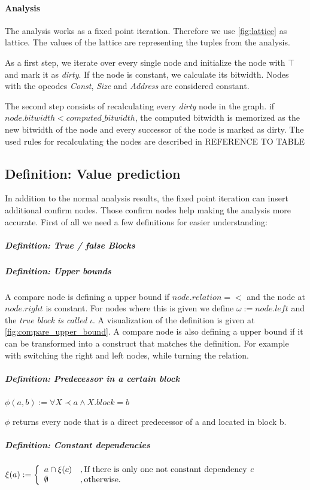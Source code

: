 

\paragraph{Analysis} The analysis works as a fixed point iteration. Therefore we use  \ref{fig:lattice} as lattice. The values of the lattice are representing the tuples from the analysis.

As a first step, we iterate over every single node and initialize the node with $\top$ and mark it as \textit{dirty}. If the node is constant, we calculate its bitwidth. Nodes with the opcodes \textit{Const}, \textit{Size} and \textit{Address} are considered constant.

The second step consists of recalculating every \textit{dirty} node in the graph. if $node.bitwidth < computed\_bitwidth$, the computed bitwidth is memorized as the new bitwidth of the node and every successor of the node is marked as dirty. The used rules for recalculating the nodes are described in REFERENCE TO TABLE %

\subsection{Definition: Value prediction}
In addition to the normal analysis results, the fixed point iteration can insert additional 
confirm nodes. Those confirm nodes help making the analysis more accurate.
First of all we need a few definitions for easier understanding:

\subparagraph{Definition: True / false Blocks}

\subparagraph{Definition: Upper bounds}

A compare node is defining a upper bound if $node.relation = <$ and the node at $node.right$ is constant. For nodes where this is given we define
\emph{$\omega := node.left$} and the \emph{true block is called $\iota$}. A visualization of the definition is given at \ref{fig:compare_upper_bound}.
A compare node is also defining a upper bound if it can be transformed into a construct that matches the definition. For example with switching the right and left nodes, while turning the relation.
\subparagraph{Definition: Predecessor in a certain block}
\begin{center}
$\phi(a, b) := \forall X \prec a \wedge X.block = b$ 
\end{center}
$\phi$ returns every node that is a direct predecessor of a and located in block b.
\subparagraph{Definition: Constant dependencies}
\begin{center}
$\xi(a) := 
\left\{
	\begin{array}{l}
		a \cap \xi(c)\\ 
		\emptyset
	\end{array}
	\begin{array}{l}
		, \text{If there is only one not constant dependency \textit{c}} \\ 
		, \text{otherwise}.
	\end{array}
\right.$
\end{center}

